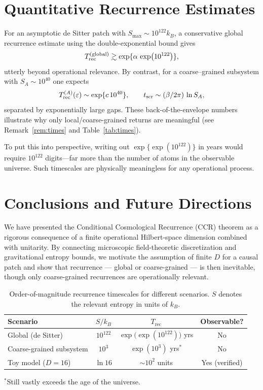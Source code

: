 \documentclass[12pt]{article}
\theoremstyle{remark}
\begin{document}
\section{Quantitative Recurrence Estimates}
For an asymptotic de Sitter patch with $S_{\max}\sim 10^{122} k_B$, a conservative global recurrence estimate using the double-exponential bound gives
\[
 T^{\rm (global)}_{\rm rec} \gtrsim \exp\{\alpha\,\exp(10^{122})\},
\]
utterly beyond operational relevance. By contrast, for a coarse--grained subsystem with $S_A\sim 10^{40}$ one expects
\[
 T^{(A)}_{\rm rec}(\varepsilon) \sim \exp\{c\,10^{40}\},\qquad t_{\rm scr} \sim (\beta/2\pi)\,\ln S_A,
\]
separated by exponentially large gaps. These back-of-the-envelope numbers illustrate why only local/coarse-grained returns are meaningful (see Remark~\ref{rem:times} and Table~\ref{tab:times}).

To put this into perspective, writing out $\exp\{\exp(10^{122})\}$ in years would require $10^{122}$ digits---far more than 
the number of atoms in the observable universe. Such timescales are physically meaningless for any operational process.


\section{Conclusions and Future Directions}
We have presented the Conditional Cosmological Recurrence (CCR) theorem as a rigorous consequence of 
a finite operational Hilbert-space dimension combined with unitarity. 
By connecting microscopic field-theoretic discretization and gravitational entropy bounds, 
we motivate the assumption of finite $D$ for a causal patch and show that recurrence --- global or coarse-grained --- 
is then inevitable, though only coarse-grained recurrences are operationally relevant.

\vspace{0.5cm}

\begin{table}[H]
\centering
\caption{Order-of-magnitude recurrence timescales for different scenarios. 
$S$ denotes the relevant entropy in units of $k_B$.}
\vspace{0.2cm}
\begin{tabular}{lccc}
\hline
\textbf{Scenario} & \textbf{$S/k_B$} & \textbf{$T_{\mathrm{rec}}$} & \textbf{Observable?} \\
\hline
Global (de Sitter) & $10^{122}$ & $\exp\!\big(\exp(10^{122})\big)$ yrs & No \\
Coarse-grained subsystem & $10^{3}$ & $\exp(10^{3})$ yrs$^{\ast}$ & No \\
Toy model ($D=16$) & $\ln 16$ & $\sim 10^{2}$ units & Yes (verified) \\
\hline
\end{tabular}
\label{tab:timescales}
\end{table}
\vspace{-0.3cm}
{\footnotesize $^{\ast}$Still vastly exceeds the age of the universe.}
\end{document}
